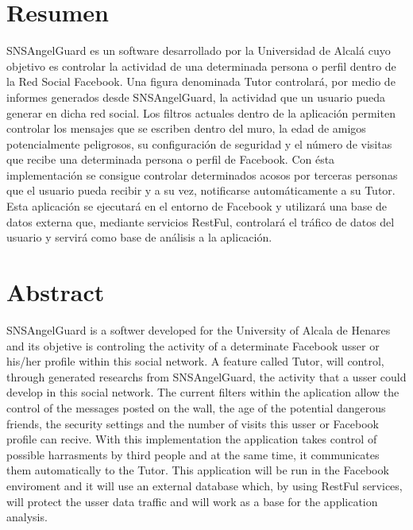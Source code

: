 \chapter{Resumen}
SNSAngelGuard es un software desarrollado por la Universidad de Alcalá cuyo objetivo es controlar la actividad de una determinada persona o perfil dentro de la Red Social Facebook.  Una figura denominada Tutor controlará, por medio de informes generados desde SNSAngelGuard, la actividad que un usuario pueda generar en dicha red social. Los filtros actuales dentro de la aplicación permiten controlar los mensajes que se escriben dentro del muro, la edad de amigos potencialmente peligrosos, su configuración de seguridad y el número de visitas que recibe una determinada persona o perfil de Facebook. Con ésta implementación se consigue controlar determinados acosos por terceras personas que el usuario pueda recibir y a su vez, notificarse automáticamente a su Tutor. Esta aplicación se ejecutará en el entorno de Facebook y utilizará una base de datos externa que, mediante servicios RestFul, controlará el tráfico de datos del usuario y servirá como base de análisis a la aplicación.

\chapter{Abstract}
SNSAngelGuard is a softwer developed for the University of Alcala de Henares and its objetive is controling the activity of a determinate Facebook usser or his/her profile within this social network. A feature called Tutor, will control, through generated researchs from SNSAngelGuard, the activity that a usser could develop in this social network. The current filters within the aplication allow the control of the messages posted on the wall, the age of the potential dangerous friends, the security settings and the number of visits this usser or Facebook profile can recive. With this implementation the application takes control of possible harrasments by third people and at the same time, it communicates them automatically to the Tutor. This application will be run in the Facebook enviroment and it will  use an external database which, by using RestFul services, will protect the usser data traffic and will work as a base for the application analysis.

